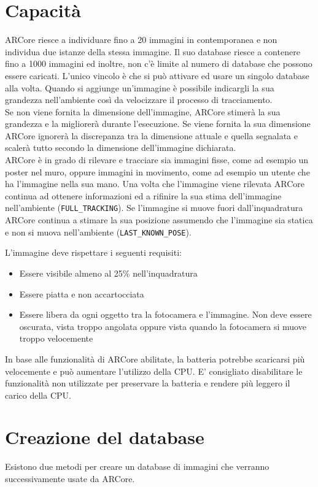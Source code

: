 \documentclass[crop=false, class=book]{standalone}
\begin{document}
	\section{Capacità}
	ARCore riesce a individuare fino a 20 immagini in contemporanea e non individua due istanze della stessa immagine. Il suo database riesce a contenere fino a 1000 immagini ed inoltre, non c’è limite al numero di database che possono essere caricati. L’unico vincolo è che si può attivare ed usare un singolo database alla volta. Quando si aggiunge un’immagine è possibile indicargli la sua grandezza nell’ambiente così da velocizzare il processo di tracciamento. \\
	\noindent
	Se non viene fornita la dimensione dell’immagine, ARCore stimerà la sua grandezza e la migliorerà durante l’esecuzione. Se viene fornita la sua dimensione ARCore ignorerà la discrepanza tra la dimensione attuale e quella segnalata e scalerà tutto secondo la dimensione dell’immagine dichiarata.\\
	\noindent
	ARCore è in grado di rilevare e tracciare sia immagini fisse, come ad esempio un poster nel muro, oppure immagini in movimento, come ad esempio un utente che ha l’immagine nella sua mano.
	Una volta che l’immagine viene rilevata ARCore continua ad ottenere informazioni ed a rifinire la sua stima dell’immagine nell’ambiente (\verb|FULL_TRACKING|).
	Se l’immagine si muove fuori dall’inquadratura ARCore continua a stimare la sua posizione assumendo che l’immagine sia statica e non si muova nell’ambiente (\verb|LAST_KNOWN_POSE|).

	\newpage
	\noindent
	L’immagine deve rispettare i seguenti requisiti:
	\begin{itemize}
		\item Essere visibile almeno al 25\% nell'inquadratura
		\item Essere piatta e non accartocciata
		\item Essere libera da ogni oggetto tra la fotocamera e l'immagine. Non deve essere oscurata, vista troppo angolata oppure vista quando la fotocamera si muove troppo velocemente
	\end{itemize}
	
	\noindent
	In base alle funzionalità di ARCore abilitate, la batteria potrebbe scaricarsi più velocemente e può aumentare l’utilizzo della CPU. E’ consigliato disabilitare le funzionalità non utilizzate per preservare la batteria e rendere più leggero il carico della CPU.
	
	\section{Creazione del database}
	Esistono due metodi per creare un database di immagini che verranno successivamente usate da ARCore.
	\\
	
\end{document}
